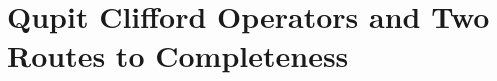 \begin{code}[hide]
\AgdaSymbol{\{}\AgdaSpace{}%
\AgdaSpace{}%
\AgdaSymbol{:}\AgdaSpace{}%
\AgdaSpace{}%
\AgdaSymbol{(}\AgdaSpace{}%
\AgdaSymbol{)\}}\AgdaSpace{}%
\AgdaSpace{}%
\AgdaSpace{}%
\AgdaSpace{}%
\AgdaSpace{}%
\AgdaSpace{}%
\AgdaSpace{}%
\AgdaSpace{}%
\<%
\\
%
\>[2]\AgdaSpace{}%
\AgdaSymbol{:}\AgdaSpace{}%
\AgdaSpace{}%
\AgdaSymbol{\{}\AgdaSymbol{\}}\AgdaSpace{}%
\AgdaSymbol{(}\AgdaSpace{}%
\AgdaSymbol{:}\AgdaSpace{}%
\AgdaSpace{}%
\AgdaSymbol{(}\AgdaSpace{}%
\AgdaSymbol{))}\AgdaSpace{}%
\AgdaSymbol{\{}\AgdaSpace{}%
\AgdaSymbol{\}}\AgdaSpace{}%
\AgdaSpace{}%
\AgdaSpace{}%
\AgdaSpace{}%
\AgdaSpace{}%
\AgdaSpace{}%
\AgdaSpace{}%
\AgdaSpace{}%
\AgdaSpace{}%
\AgdaSpace{}%
\AgdaSpace{}%
\AgdaSpace{}%
\<%
\\
%
\>[2]\AgdaSpace{}%
\AgdaSymbol{:}\AgdaSpace{}%
\AgdaSpace{}%
\AgdaSymbol{\{}\AgdaSymbol{\}}\AgdaSpace{}%
\AgdaSymbol{(}\AgdaSpace{}%
\AgdaSymbol{:}\AgdaSpace{}%
\AgdaSpace{}%
\AgdaSymbol{(}\AgdaSpace{}%
\AgdaSymbol{))}\AgdaSpace{}%
\AgdaSpace{}%
\AgdaSpace{}%
\AgdaSpace{}%
\<%
\\
%
\>[2]\AgdaSpace{}%
\AgdaSpace{}%
\AgdaSpace{}%
\AgdaSpace{}%
\AgdaSpace{}%
\AgdaSpace{}%
\AgdaSymbol{:}\AgdaSpace{}%
\AgdaSpace{}%
\AgdaSymbol{\{}\AgdaSymbol{\}}\AgdaSpace{}%
\AgdaSymbol{\{}\AgdaSpace{}%
\AgdaSymbol{:}\AgdaSpace{}%
\AgdaSpace{}%
\AgdaSymbol{\}}\AgdaSpace{}%
\AgdaSpace{}%
\<%
\end{code}
\section{Qupit Clifford Operators and Two Routes to Completeness}\label{sec:two-routes}

